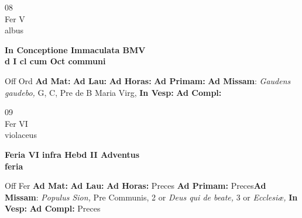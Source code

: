 \documentclass[10pt, openany]{book}
\begin{document}
        \begin{center}
            \begin{minipage}{3.5in}
                \vspace{2em}
                \begin{minipage}{0.5in}
                    {\Huge 08} \\
                    {\normalsize Fer V} \\
                    {\normalsize albus}
                \end{minipage}
                \begin{minipage}{3.0in}
                    \textbf{ \large In Conceptione Immaculata BMV \\
                    \textnormal{\normalsize d I cl cum Oct communi}} \\ 
                \end{minipage}
                \begin{justify}Off Ord
                    \textbf{Ad Mat: }
                    \textbf{Ad Lau: }
                    \textbf{Ad Horas: }
                    \textbf{Ad Primam: }\textbf{Ad Missam}: \textit{Gaudens gaudebo,} G, C, Pre de B Maria Virg,  
                    \textbf{In Vesp: }
                    \textbf{Ad Compl: }
                \end{justify}
            \end{minipage}
        \end{center}
    
        \begin{center}
            \begin{minipage}{3.5in}
                \vspace{2em}
                \begin{minipage}{0.5in}
                    {\Huge 09} \\
                    {\normalsize Fer VI} \\
                    {\normalsize violaceus}
                \end{minipage}
                \begin{minipage}{3.0in}
                    \textbf{ \large Feria VI infra Hebd II Adventus \\
                    \textnormal{\normalsize feria}} \\ 
                \end{minipage}
                \begin{justify}Off Fer
                    \textbf{Ad Mat: }
                    \textbf{Ad Lau: }
                    \textbf{Ad Horas: }Preces
                    \textbf{Ad Primam: }Preces\textbf{Ad Missam}: \textit{Populus Sion,} Pre Communis, 2 or \textit{Deus qui de beate,} 3 or \textit{Ecclesiæ,}  
                    \textbf{In Vesp: }
                    \textbf{Ad Compl: }Preces
                \end{justify}
            \end{minipage}
        \end{center}
    
\end{document}
